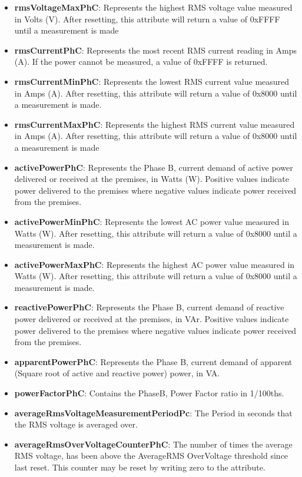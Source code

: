 \begin{itemize}
\item \textbf{rmsVoltageMaxPhC}: Represents the highest RMS voltage value measured in Volts (V). After resetting, this attribute will return a value of 0xFFFF until a measurement is made
\item \textbf{rmsCurrentPhC}: Represents the most recent RMS current reading in Amps (A). If the power cannot be measured, a value of 0xFFFF is returned.
\item \textbf{rmsCurrentMinPhC}: Represents the lowest RMS current value measured in Amps (A). After resetting, this attribute will return a value of 0x8000 until a measurement is made.
\item \textbf{rmsCurrentMaxPhC}: Represents the highest RMS current value measured in Amps (A). After resetting, this attribute will return a value of 0x8000 until a measurement is made
\item \textbf{activePowerPhC}: Represents the Phase B, current demand of active power delivered or received at the premises, in Watts (W). Positive values indicate power delivered to the premises where negative values indicate power received from the premises.
\item \textbf{activePowerMinPhC}: Represents the lowest AC power value measured in Watts (W). After resetting, this attribute will return a value of 0x8000 until a measurement is made.
\item \textbf{activePowerMaxPhC}: Represents the highest AC power value measured in Watts (W). After resetting, this attribute will return a value of 0x8000 until a measurement is made.
\item \textbf{reactivePowerPhC}: Represents the Phase B, current demand of reactive power delivered or received at the premises, in VAr. Positive values indicate power delivered to the premises where negative values indicate power received from the premises.
\item \textbf{apparentPowerPhC}: Represents the Phase B, current demand of apparent (Square root of active and reactive power) power, in VA.
\item \textbf{powerFactorPhC}: Contains the PhaseB, Power Factor ratio in 1/100ths.
\item \textbf{averageRmsVoltageMeasurementPeriodPc}: The Period in seconds that the RMS voltage is averaged over.
\item \textbf{averageRmsOverVoltageCounterPhC}: The number of times the average RMS voltage, has been above the AverageRMS OverVoltage threshold since last reset. This counter may be reset by writing zero to the attribute.

\end{itemize}
